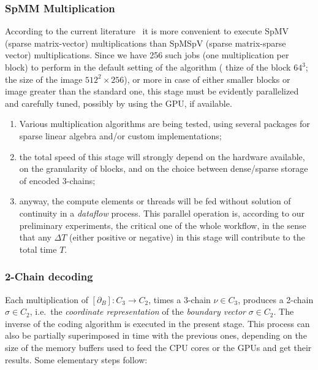 \subsubsection*{SpMM Multiplication}\label{SpMM-multiplication}
According to the current literature~
\cite{Buluc2017} it is more convenient to execute SpMV (sparse matrix-vector) multiplications than SpMSpV (sparse matrix-sparse vector) multiplications. Since we have 256 such jobs (one multiplication per block) to perform in the default setting of the algorithm (
thize of the block $64^3$; the size of the image $512^2\times 256$), or more in case of either smaller blocks or image greater than the standard one, this stage must be evidently parallelized and carefully tuned, possibly by using the GPU, if available.
\begin{enumerate}

\item Various multiplication algorithms are being tested, using several packages for sparse linear algebra and/or custom implementations;

\item the total speed of this stage will strongly depend on the hardware available, on the granularity of blocks, and on the choice between dense/sparse storage of encoded 3-chains;

\item anyway, the compute elements or threads will be fed without solution of continuity in a \emph{dataflow} process. This parallel operation is, according to our preliminary experiments, the critical one of the whole workflow, in the sense that any $\Delta T$ (either positive or negative) in this stage will contribute to the total time $T$.

\end{enumerate}

\subsubsection*{2-Chain decoding}\label{sec:two-chain-decoding}
Each multiplication of $[\partial_B] : C_3 \to C_2$, times a 3-chain $\nu\in C_3$, produces a 2-chain  $\sigma\in C_2$, i.e.~the \emph{coordinate representation} of the \emph{boundary vector} $\sigma\in C_2$.  The inverse of the coding algorithm is executed in the present stage.  This process can also be partially superimposed in time with the previous ones, depending on the size of the memory buffers used to feed the CPU cores or the GPUs and get their results. Some elementary steps follow:

